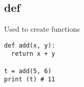 \subsection{def}
Used to create functions

\begin{lstlisting}
def add(x, y):
  return x + y

t = add(5, 6)
print (t) # 11
\end{lstlisting}
